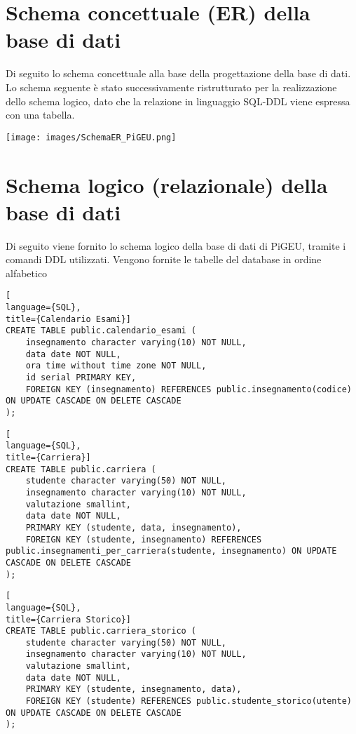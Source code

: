 \documentclass{article}
\begin{document}
\section{Schema concettuale (ER) della base di dati}
Di seguito lo schema concettuale alla base della progettazione della base di dati.
Lo schema seguente è stato successivamente ristrutturato per la realizzazione dello schema logico, dato che la relazione in linguaggio SQL-DDL viene espressa con una tabella.


\texttt{[image: images/SchemaER\_PiGEU.png]}

\section{Schema logico (relazionale) della base di dati}
Di seguito viene fornito lo schema logico della base di dati di PiGEU, tramite i comandi DDL utilizzati. Vengono fornite le tabelle del database in ordine alfabetico
\pagebreak



\begin{lstlisting}[
language={SQL},
title={Calendario Esami}]
CREATE TABLE public.calendario_esami (
    insegnamento character varying(10) NOT NULL,
    data date NOT NULL,
    ora time without time zone NOT NULL,
    id serial PRIMARY KEY,
    FOREIGN KEY (insegnamento) REFERENCES public.insegnamento(codice) ON UPDATE CASCADE ON DELETE CASCADE
);
\end{lstlisting}

\begin{lstlisting}[
language={SQL},
title={Carriera}]
CREATE TABLE public.carriera (
    studente character varying(50) NOT NULL,
    insegnamento character varying(10) NOT NULL,
    valutazione smallint,
    data date NOT NULL,
    PRIMARY KEY (studente, data, insegnamento),
    FOREIGN KEY (studente, insegnamento) REFERENCES public.insegnamenti_per_carriera(studente, insegnamento) ON UPDATE CASCADE ON DELETE CASCADE
);
\end{lstlisting}

\begin{lstlisting}[
language={SQL},
title={Carriera Storico}]
CREATE TABLE public.carriera_storico (
    studente character varying(50) NOT NULL,
    insegnamento character varying(10) NOT NULL,
    valutazione smallint,
    data date NOT NULL,
    PRIMARY KEY (studente, insegnamento, data),
    FOREIGN KEY (studente) REFERENCES public.studente_storico(utente) ON UPDATE CASCADE ON DELETE CASCADE
);
\end{lstlisting}
\end{document}
